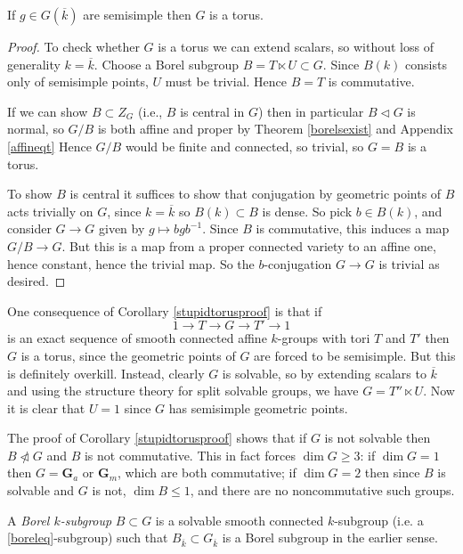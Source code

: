 \documentclass[10pt]{article}
\renewcommand{\(}{\left(}
\renewcommand{\)}{\right)}
\renewcommand{\bar}{\overline}
\numberwithin{thm}{subsection}
\begin{document}
\begin{cor}\label{stupidtorusproof}
If $g\in G(\overline{k})$ are semisimple then $G$ is a torus.
\end{cor}
\begin{proof}
To check whether $G$ is a torus we can extend scalars, so without loss
of generality $k=\overline{k}$.
Choose a Borel subgroup $B=T\ltimes U\subset G$.
Since $B(k)$ consists only of semisimple points, $U$ must be trivial.
Hence $B=T$ is commutative.

If we can show $B\subset Z_G$ (i.e., $B$ is central in $G$) 
then in particular $B\vartriangleleft G$ is normal,
so $G/B$ is both affine and proper by Theorem \ref{borelsexist}
and Appendix \ref{affineqt}
Hence $G/B$ would be finite and connected, so trivial, so $G=B$
is a torus.

To show $B$ is central it suffices to show that conjugation by geometric points
of $B$ acts trivially on $G$, since $k=\overline{k}$ so $B(k)\subset B$ is dense.
So pick $b\in B(k)$, and consider $G\rightarrow G$
given by $g\mapsto bgb^{-1}$.
Since $B$ is commutative, this induces a map
$G/B\rightarrow G$.
But this is a map from a proper connected variety to an affine one,
hence constant, hence the trivial map.
So the $b$-conjugation $G\rightarrow G$ is trivial as desired.
\end{proof}
\begin{rem}\label{}
One consequence of Corollary \ref{stupidtorusproof}
is that if 
$$1\rightarrow T \rightarrow G\rightarrow T' \rightarrow 1$$
is an exact sequence of smooth connected affine
$k$-groups with tori $T$ and $T'$ then $G$ is a torus,
since the geometric points of $G$ are forced to be semisimple.
But this is definitely overkill.
Instead, clearly $G$ is solvable, so by extending scalars to $\bar k$
and using the structure theory for split solvable groups, we have 
$G= T''\ltimes U$.
Now it is clear that $U=1$ since $G$ has semisimple geometric points.
\end{rem}
\begin{rem}\label{lowdimsolvable}
The proof of Corollary \ref{stupidtorusproof}
shows that if $G$ is not solvable then $B\not\vartriangleleft G$
and $B$ is not commutative.
This in fact forces $\dim G \geq 3$:
if $\dim G = 1$ then $G=\mathbf{G}_a$ or $\mathbf{G}_m$, which are both commutative;
if $\dim G = 2$ then since $B$ is solvable and $G$ is not,
$\dim B\leq 1$, and there are no noncommutative such groups.
\end{rem}
\begin{defn}\label{}
A \textit{Borel $k$-subgroup} $B\subset G$
is a solvable smooth connected $k$-subgroup (i.e. a \eqref{boreleq}-subgroup)
such that $B_{\overline{k}}\subset G_{\overline{k}}$
is a Borel subgroup in the earlier sense.
\end{defn}
\end{document}
